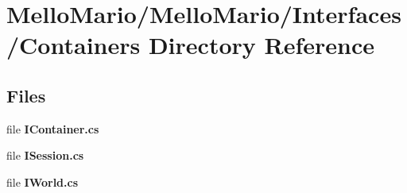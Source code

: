 \section{Mello\+Mario/\+Mello\+Mario/\+Interfaces/\+Containers Directory Reference}
\label{dir_b064164f2940c95c04d3d2f80c244264}
\subsection*{Files}
\begin{DoxyCompactItemize}
\item 
file \textbf{ I\+Container.\+cs}
\item 
file \textbf{ I\+Session.\+cs}
\item 
file \textbf{ I\+World.\+cs}
\end{DoxyCompactItemize}
